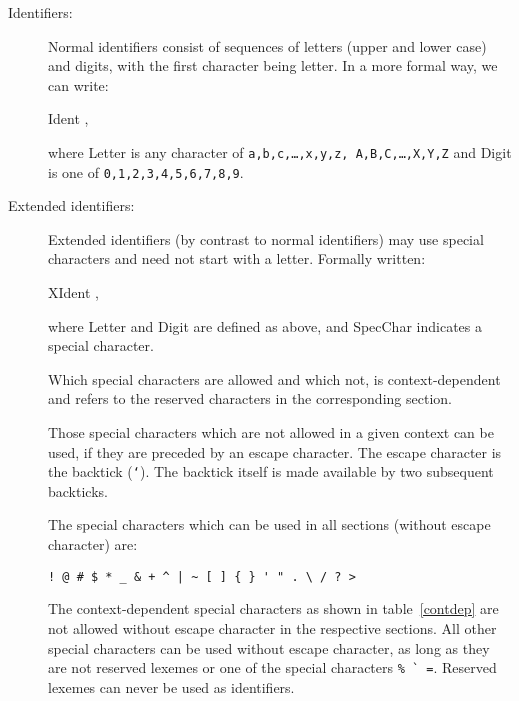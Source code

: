\begin{description}
\item[Identifiers:]
Normal identifiers consist of sequences of letters (upper and lower case)
and digits, with
the first character being letter. In a more formal way, we can write:

{\vs Ident}  ,

where {\vs Letter} is any character of {\tt a,b,c,\dots,x,y,z,
A,B,C,\dots,X,Y,Z} and
{\vs Digit} is one of {\tt 0,1,2,3,4,5,6,7,8,9}.

\item[Extended identifiers:]
Extended identifiers (by contrast to normal identifiers) may use special characters and
need not start with a letter.
Formally written:

{\vs XIdent} \gprod {},

where {\vs Letter} and {\vs Digit} are defined as above, and {\vs SpecChar}
indicates a special character.

Which special characters are allowed and which not, is context-dependent and
refers to the reserved characters in the corresponding section.

Those special characters which are not allowed in a given context can be used, if
they are preceded by an escape character. The escape character is the backtick
({\tt `}). The backtick itself is made available by two subsequent backticks.

The special characters which can be used in all sections (without escape
character) are:

{\tt\verb:! @ # $ * _ & + ^ | ~ [ ] { } ' " . \ / ? >:}

The context-dependent special characters as shown in table~\ref{contdep}
are not allowed without escape character in the respective sections.
All other special characters can be used without escape character,
as long as they are not reserved lexemes or one of the special characters
{\tt\verb!% ` =!}.  Reserved lexemes can never be used
as identifiers.


\end{description}
